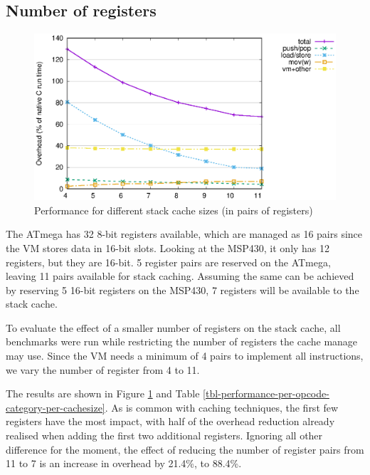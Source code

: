 \subsection{Number of registers}

\begin{figure}
\centering
\includegraphics[width=\mygraphsize]{cachesize-performance-per-opcode-category.eps}
\caption{Performance for different stack cache sizes (in pairs of registers)}
\label{fig-performance-per-opcode-category-per-cachesize}
\end{figure}



The ATmega has 32 8-bit registers available, which are managed as 16 pairs since the VM stores data in 16-bit slots. Looking at the MSP430, it only has 12 registers, but they are 16-bit. 5 register pairs are reserved on the ATmega, leaving 11 pairs available for stack caching. Assuming the same can be achieved by reserving 5 16-bit registers on the MSP430, 7 registers will be available to the stack cache.

To evaluate the effect of a smaller number of registers on the stack cache, all benchmarks were run while restricting the number of registers the cache manage may use. Since the VM needs a minimum of 4 pairs to implement all instructions, we vary the number of register from 4 to 11.

The results are shown in Figure \ref{fig-performance-per-opcode-category-per-cachesize} and Table \ref{tbl-performance-per-opcode-category-per-cachesize}. As is common with caching techniques, the first few registers have the most impact, with half of the overhead reduction already realised when adding the first two additional registers. Ignoring all other difference for the moment, the effect of reducing the number of register pairs from 11 to 7 is an increase in overhead by 21.4\%, to 88.4\%.

